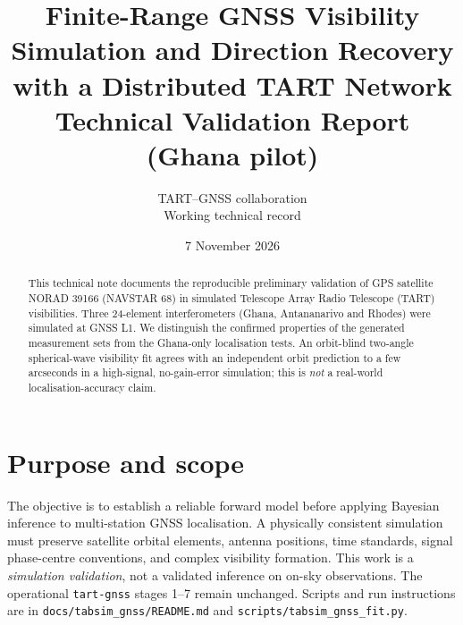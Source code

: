 \documentclass[11pt,a4paper]{article}
\title{Finite-Range GNSS Visibility Simulation and Direction Recovery with a Distributed TART Network\\\large Technical Validation Report (Ghana pilot)}
\author{TART--GNSS collaboration\\Working technical record}
\date{7 November 2026}
\begin{document}
\maketitle
\begin{abstract}
This technical note documents the reproducible preliminary validation of GPS satellite
NORAD 39166 (NAVSTAR 68) in simulated Telescope Array Radio Telescope (TART)
visibilities. Three 24-element interferometers (Ghana, Antananarivo and Rhodes)
were simulated at GNSS L1. We distinguish the confirmed properties of the generated
measurement sets from the Ghana-only localisation tests. An orbit-blind
two-angle spherical-wave visibility fit agrees with an independent orbit prediction
to a few arcseconds in a high-signal, no-gain-error simulation; this is \emph{not}
a real-world localisation-accuracy claim.
\end{abstract}
\section{Purpose and scope}
The objective is to establish a reliable forward model before applying Bayesian
inference to multi-station GNSS localisation. A physically consistent
simulation must preserve satellite orbital elements, antenna positions, time
standards, signal phase-centre conventions, and complex visibility formation.
This work is a \emph{simulation validation}, not a validated inference on
on-sky observations. The operational \texttt{tart-gnss} stages 1--7 remain
unchanged. Scripts and run instructions are in
\texttt{docs/tabsim\_gnss/README.md} and \texttt{scripts/tabsim\_gnss\_fit.py}.
\end{document}
